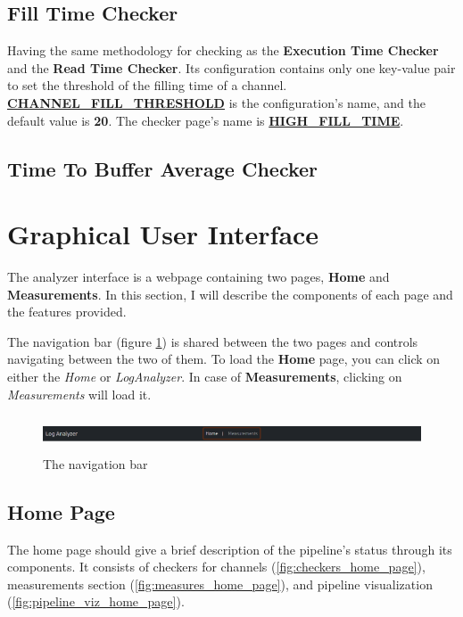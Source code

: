 \subsection{Fill Time Checker}
Having the same methodology for checking as the \textbf{Execution Time Checker} and the \textbf{Read Time Checker}.
Its configuration contains only one key-value pair to set the threshold of the filling time of a channel.
\textbf{\url{CHANNEL_FILL_THRESHOLD}} is the configuration's name, and the default value is \textbf{20}. The checker page's
name is \textbf{\url{HIGH_FILL_TIME}}.

\subsection{Time To Buffer Average Checker}

\section{Graphical User Interface}
The analyzer interface is a webpage containing two pages, \textbf{Home} and \textbf{Measurements}. In this
section, I will describe the components of each page and the features provided.

The navigation bar (figure \ref{fig:nav_bar}) is shared between the two pages and controls navigating
between the two of them. To load the \textbf{Home} page, you can click on either the \textit{Home} or
\textit{LogAnalyzer}. In case of \textbf{Measurements}, clicking on \textit{Measurements} will load it.
\newline
\begin{figure}[H]
	\centering
	\includegraphics[width=1.1\textwidth,height=40px]{images/nav_bar.png}
	\caption{The navigation bar}
	\label{fig:nav_bar}
\end{figure}

\subsection{Home Page}
The home page should give a brief description of the pipeline's status through its components. It consists
of checkers for channels (\ref{fig:checkers_home_page}), measurements section (\ref{fig:measures_home_page}), 
and pipeline visualization (\ref{fig:pipeline_viz_home_page}).

